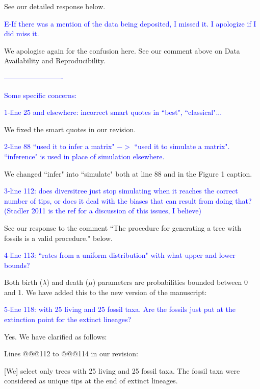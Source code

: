 \documentclass[11pt]{letter}
\begin{document}
\begin{letter}{}
See our detailed response below.


\textcolor{blue}{E-If there was a mention of the data being deposited, I missed it. I apologize if I did miss it.}

We apologise again for the confusion here. See our comment above on Data Availability and Reproducibility.


\textcolor{blue}{-------------------------}

\textcolor{blue}{Some specific concerns:}

\textcolor{blue}{1-line 25 and elsewhere: incorrect smart quotes in ``best", ``classical"...}

We fixed the smart quotes in our revision.


\textcolor{blue}{2-line 88 ``used it to infer a matrix" $->$ ``used it to simulate a matrix". ``inference" is used in place of simulation elsewhere.}

We changed ``infer" into ``simulate" both at line 88 and in the Figure 1 caption.


\textcolor{blue}{3-line 112: does diversitree just stop simulating when it reaches the correct number of tips, or does it deal with the biases that can result from doing that? (Stadler 2011 is the ref for a discussion of this issues, I believe)}

See our response to the comment ``The procedure for generating a tree with fossils is a valid procedure." below.


\textcolor{blue}{4-line 113: ``rates from a uniform distribution" with what upper and lower bounds?}

Both birth ($\lambda$) and death ($\mu$) parameters are probabilities bounded between 0 and 1. We have added this to the new version of the manuscript:


\textcolor{blue}{5-line 118: with 25 living and 25 fossil taxa. Are the fossils just put at the extinction point for the extinct lineages?}

Yes. We have clarified as follows:

Lines @@@112 to @@@114 in our revision:

\hfill\begin{minipage}{\dimexpr\textwidth-1cm}
[We] select only trees with 25 living and 25 fossil taxa. The fossil taxa were considered as unique tips at the end of extinct lineages. %
\end{minipage}


\end{letter}
\end{document}
